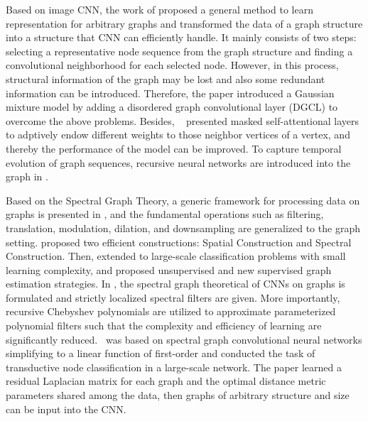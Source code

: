 \documentclass[journal]{IEEEtran}
\begin{document}
Based on image CNN, the work of \cite{niepert2016learning} proposed a general method to learn representation for arbitrary graphs and transformed the data of a graph structure into a structure that CNN can efficiently handle. It mainly consists of two steps: selecting a representative node sequence from the graph structure and finding a convolutional neighborhood for each selected node. However, in this process, structural information of the graph may be lost and also some redundant information can be introduced. Therefore, the paper \cite{DGCNN} introduced a Gaussian mixture model by adding a disordered graph convolutional layer (DGCL) to overcome the above problems. Besides, ~\cite{2017GraphAttentionnNet} presented masked self-attentional layers to adptively endow different weights to those neighbor vertices of a vertex, and thereby the performance of the model can be improved.  To  capture temporal evolution of graph sequences,  recursive neural networks are introduced into the graph in \cite{seo2016recurrent}.

Based on the Spectral Graph Theory\cite{chung1997spectral}, a generic framework for processing data on graphs is presented in \cite{shuman2013emerging}, and the fundamental operations such as filtering, translation, modulation, dilation, and downsampling are generalized to the graph setting.
\cite{BrunaZSL13} proposed two efficient constructions: Spatial Construction and Spectral Construction. Then, \cite{henaff2015deep} extended \cite{BrunaZSL13} to large-scale classification problems with small learning complexity, and proposed unsupervised and new supervised graph estimation strategies. In \cite{defferrard2016conv}, the spectral graph theoretical of CNNs on graphs is formulated and strictly localized  spectral filters are given. More importantly, recursive Chebyshev polynomials are utilized to approximate parameterized polynomial filters such that the complexity and efficiency of learning are significantly reduced.~\cite{kipf2016semi} was based on spectral graph convolutional neural networks \cite{defferrard2016conv, BrunaZSL13} simplifying to a linear function of first-order and conducted the task of transductive node classification in a large-scale network.
The paper \cite{AGCNN} learned a residual Laplacian matrix for each graph and the optimal distance metric parameters shared among the data, then graphs of arbitrary structure and size can be input into the CNN.
\end{document}

